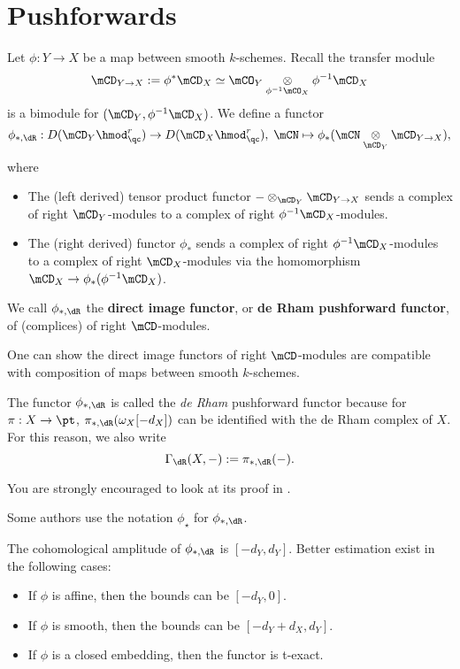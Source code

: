 \section{Pushforwards}

	

	\begin{constr}
		Let $\phi: Y\to X$ be a map between smooth $k$-schemes. Recall the transfer module
		\[
			\mCD_{Y\to X}:= \phi^*\mCD_X \simeq \mCO_Y \ot_{\phi^{-1}\mCO_X} \phi^{-1}\mCD_X  
		\]
		is a bimodule for $(\mCD_Y,\phi^{-1}\mCD_X)$. We define a functor
		\[
			\phi_{*,\dR}: D( \mCD_Y\hmod_\qc^r ) \to  D( \mCD_X\hmod_\qc^r ),\; \mCN \mapsto \phi_*(\mCN\ot_{\mCD_Y} \mCD_{Y\to X}),
		\]
		where
		\begin{itemize}
			\item 
				The (left derived) tensor product functor $-\ot_{\mCD_Y} \mCD_{Y\to X}$ sends a complex of right $\mCD_Y$-modules to a complex of right $\phi^{-1}\mCD_X$-modules. 
			\item
				The (right derived) functor $\phi_*$ sends a complex of right $\phi^{-1}\mCD_X$-modules to a complex of right $\mCD_X$-modules via the homomorphism $\mCD_X \to \phi_*(\phi^{-1}\mCD_X)$.
		\end{itemize}
		We call $\phi_{*,\dR}$ the \textbf{direct image functor}, or \textbf{de Rham pushforward functor}, of (complices) of right $\mCD$-modules. 
	\end{constr}

	\begin{rem}
		One can show the direct image functors of right $\mCD$-modules are compatible with composition of maps between smooth $k$-schemes.

	\end{rem}

	\begin{rem}
		The functor $\phi_{*,\dR}$ is called the \emph{de Rham} pushforward functor because for $\pi: X\to \pt$, $\pi_{*,\dR}(\omega_X[-d_X])$ can be identified with the de Rham complex of $X$. For this reason, we also write 
		\[
			\Gamma_{\dR}(X,-):= \pi_{*,\dR}(-).
		\]

		You are strongly encouraged to look at its proof in \cite[Sect. 5.17]{G}.
	\end{rem}

	\begin{rem}
		Some authors use the notation $\phi_\star$ for $\phi_{*,\dR}$.
	\end{rem}

	\begin{rem}
		The cohomological amplitude of $\phi_{*,\dR}$ is $[-d_Y,d_Y]$. Better estimation exist in the following cases:
		\begin{itemize}
			\item If $\phi$ is affine, then the bounds can be $[-d_Y,0]$.
			\item If $\phi$ is smooth, then the bounds can be $[-d_Y+d_X,d_Y]$.
			\item If $\phi$ is a closed embedding, then the functor is t-exact.
		\end{itemize}
	\end{rem}

